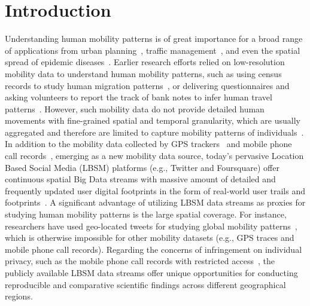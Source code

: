 \documentclass{elsart}
\begin{document}
\section{Introduction}
Understanding human mobility patterns is of great importance for a broad range of applications from urban planning~\cite{zheng2008understanding}, traffic management~\cite{jiang2009characterizing}, and even the spatial spread of epidemic diseases~\cite{belik2011natural}.
Earlier research efforts relied on low-resolution mobility data to understand human mobility patterns, such as using census records to study human migration patterns~\cite{greenwood1985human}, or delivering questionnaires and asking volunteers to report the track of bank notes to infer human travel patterns~\cite{brockmann2006scaling}.
However, such mobility data do not provide detailed human movements with fine-grained spatial and temporal granularity, which are usually aggregated and therefore are limited to capture mobility patterns of individuals~\cite{gonzalez2008understanding,Jurdak2015}.
In addition to the mobility data collected by GPS trackers~\cite{zheng2008understanding, rhee2011levy} and mobile phone call records~\cite{gonzalez2008understanding,sevtsuk2010does,kung2014exploring}, emerging as a new mobility data source, today's pervasive Location Based Social Media (LBSM) platforms (e.g., Twitter and Foursquare) offer continuous spatial Big Data streams with massive amount of detailed and frequently updated user digital footprints in the form of real-world user trails and footprints~\cite{thatcher2014living}.
A significant advantage of utilizing LBSM data streams as proxies for studying human mobility patterns is the large spatial coverage.
For instance, researchers have used geo-located tweets for studying global mobility patterns~\cite{hawelka2014geo}, which is otherwise impossible for other mobility datasets (e.g., GPS traces and mobile phone call records).
Regarding the concerns of infringement on individual privacy, such as the mobile phone call records with restricted access~\cite{giannotti2008mobility,crampton2014collect,Jurdak2015}, the publicly available LBSM data streams offer unique opportunities for conducting reproducible and comparative scientific findings across different geographical regions.\\
\end{document}
